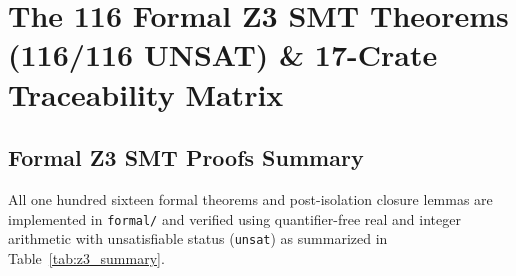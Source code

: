 \documentclass[11pt,onecolumn]{article}
\begin{document}
\FloatBarrier

\section{The 116 Formal Z3 SMT Theorems (116/116 UNSAT) \& 17-Crate Traceability Matrix}
\label{sec:smt_theorems_94}

\subsection{Formal Z3 SMT Proofs Summary}
All one hundred sixteen formal theorems and post-isolation closure lemmas are implemented in \texttt{formal/} and verified using quantifier-free real and integer arithmetic with unsatisfiable status (\texttt{unsat}) as summarized in Table~\ref{tab:z3_summary}.
\end{document}
